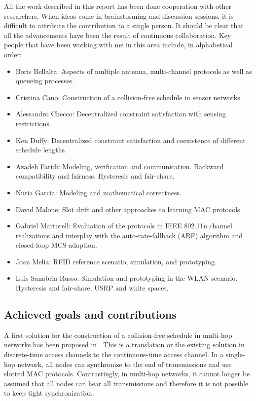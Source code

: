 \documentclass[a4paper,twocolumns]{article}%
\begin{document}
All the work described in this report has been done cooperation with other researchers.
When ideas come in brainstorming and discussion sessions, it is difficult to attribute the contribution to a single person.
It should be clear that all the advancements have been the result of continuous collaboration.
Key people that have been working with me in this area include, in alphabetical order:
\begin{itemize}
\item Boris Bellalta: Aspects of multiple antenna, multi-channel protocols as well as queueing processes.
\item Cristina Cano: Construction of a collision-free schedule in sensor networks.
\item Alessandro Checco: Decentralized constraint satisfaction with sensing restrictions.
\item Ken Duffy: Decentralized constraint satisfaction and coexistence of different schedule lengths.
\item Azadeh Faridi: Modeling, verification and communication. Backward compatibility and fairness. Hysteresis and fair-share.
\item Nuria Garcia: Modeling and mathematical correctness.
\item David Malone: Slot drift and other approaches to learning MAC protocols.
\item Gabriel Martorell: Evaluation of the protocols in IEEE 802.11n channel realizations and interplay with the auto-rate-fallback (ARF) algorithm and closed-loop MCS adaption.
\item Joan Melia: RFID reference scenario, simulation, and prototyping.
\item Luis Sanabria-Russo: Simulation and prototyping in the WLAN scenario. Hysteresis and fair-share. USRP and white spaces.
\end{itemize}

\subsection{Achieved goals and contributions}

A first solution for the construction of a collision-free schedule in multi-hop networks has been proposed in \cite{barcelo2013dcc}.
This is a translation or the existing solution in discrete-time access channels to the continuous-time access channel.
In a single-hop network, all nodes can synchronize to the end of transmissions and use slotted MAC protocols.
Contrastingly, in multi-hop networks, it cannot longer be assumed that all nodes can hear all transmissions and therefore it is not possible to keep tight synchronization.
\end{document}
